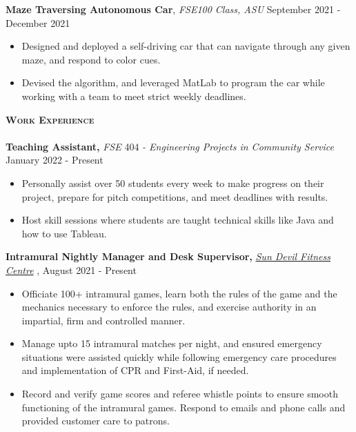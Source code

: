 \documentclass[a4paper]{article}
\newcommand{\lineunder} {
    \vspace*{-8pt} \\
    \hspace*{-18pt} \hrulefill \\
}
\newcommand{\header} [1] {
    {\hspace*{-15pt}\vspace*{3pt} \textsc{#1}}
    \vspace*{-6pt} \lineunder
}
\begin{document}
{\begin{itemize}
\end{itemize}

\textbf{Maze Traversing Autonomous Car}, \textit{FSE100 Class, ASU}
\hfill September 2021 - December 2021\\
\vspace{-3mm}
\begin{itemize}
    \itemsep-0.05em
    \item Designed and deployed a self-driving car that can navigate through any given maze, and respond to color cues. 
    \item Devised the algorithm, and leveraged MatLab to program the car while working with a team to meet strict weekly deadlines. 
\end{itemize}

\vspace{-1mm}
    \header{\textbf{Work Experience}}

    \textbf{Teaching Assistant, } \textit{FSE} 404 \textit{- Engineering Projects in Community Service} \hfill January 2022 - Present\\
    \vspace{-3mm}
    \begin{itemize}
        \itemsep-0.05em
        \item Personally assist over 50 students every week to make progress on their project, prepare for pitch competitions, and meet deadlines with results. 
        \item Host skill sessions where students are taught technical skills like Java and how to use Tableau.
    \end{itemize}

\textbf{Intramural Nightly Manager and Desk Supervisor, } \textit{{\href{https://fitness.asu.edu/programs/intramurals}{Sun Devil Fitness Centre}} \faExternalLink},   \hfill August 2021 - Present\\
\vspace{-3mm}
\begin{itemize}
    \itemsep-0.05em
    \item Officiate 100+ intramural games, learn both the rules of the game and the mechanics necessary to enforce the rules, and exercise authority in an impartial, firm and controlled manner. 
    \item Manage upto 15 intramural matches per night, and ensured emergency situations were assisted quickly while following emergency care procedures and implementation of CPR and First-Aid, if needed.  
    \item Record and verify game scores and referee whistle points to ensure smooth functioning of the intramural games. Respond to emails and phone calls and provided customer care to patrons.
\end{itemize}



}
\end{document}
